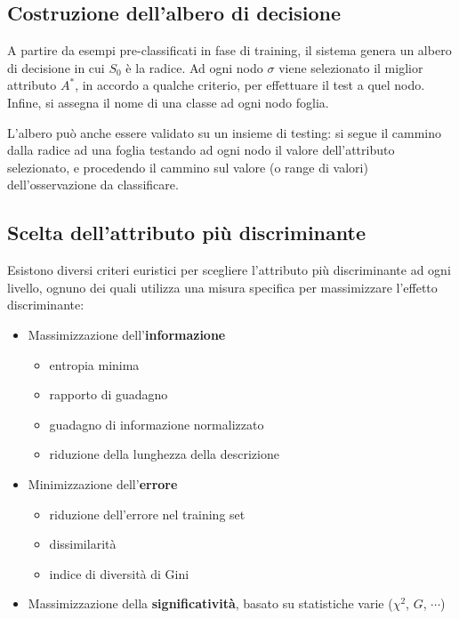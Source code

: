 \documentclass[preprint]{acm_proc_article-sp}
\begin{document}
\subsection{Costruzione dell'albero di decisione}
A partire da esempi pre-classificati in fase di training, il sistema genera un albero di decisione in cui $S_0$ è la radice. Ad ogni nodo $\sigma$ viene selezionato il miglior attributo $A^*$, in accordo a qualche criterio, per effettuare il test a quel nodo. Infine, si assegna il nome di una classe ad ogni nodo foglia.

L'albero può anche essere validato su un insieme di testing: si segue il cammino dalla radice ad una foglia testando ad ogni nodo il valore dell'attributo selezionato, e procedendo il cammino sul valore (o range di valori) dell'osservazione da classificare.

\subsection{Scelta dell'attributo più discriminante}
Esistono diversi criteri euristici per scegliere l'attributo più discriminante ad ogni livello, ognuno dei quali utilizza una misura specifica per massimizzare l'effetto discriminante:
\begin{itemize}
\item Massimizzazione dell'\textbf{informazione}
	\begin{itemize}
	\item entropia minima
	\item rapporto di guadagno
	\item guadagno di informazione normalizzato
	\item riduzione della lunghezza della descrizione
	\end{itemize}
\item Minimizzazione dell'\textbf{errore}
	\begin{itemize}
	\item riduzione dell'errore nel training set
	\item dissimilarità
	\item indice di diversità di Gini
	\end{itemize}
\item Massimizzazione della \textbf{significatività}, basato su statistiche varie ($\chi^2$, $G$, $\cdots$)
\end{itemize}
\end{document}
